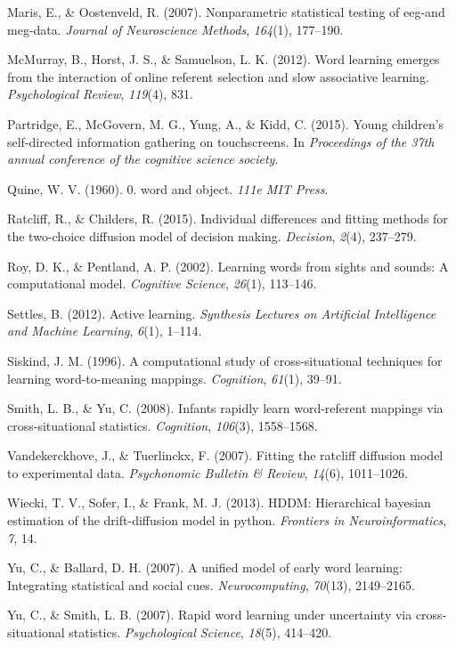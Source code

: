 \documentclass[man,floatsintext]{apa6}
\begin{document}
\hypertarget{ref-maris2007nonparametric}{}
Maris, E., \& Oostenveld, R. (2007). Nonparametric statistical testing
of eeg-and meg-data. \emph{Journal of Neuroscience Methods},
\emph{164}(1), 177--190.

\hypertarget{ref-mcmurray2012word}{}
McMurray, B., Horst, J. S., \& Samuelson, L. K. (2012). Word learning
emerges from the interaction of online referent selection and slow
associative learning. \emph{Psychological Review}, \emph{119}(4), 831.

\hypertarget{ref-partridge2015young}{}
Partridge, E., McGovern, M. G., Yung, A., \& Kidd, C. (2015). Young
children's self-directed information gathering on touchscreens. In
\emph{Proceedings of the 37th annual conference of the cognitive science
society}.

\hypertarget{ref-quine19600}{}
Quine, W. V. (1960). 0. word and object. \emph{111e MIT Press}.

\hypertarget{ref-ratcliff2015individual}{}
Ratcliff, R., \& Childers, R. (2015). Individual differences and fitting
methods for the two-choice diffusion model of decision making.
\emph{Decision}, \emph{2}(4), 237--279.

\hypertarget{ref-roy2002learning}{}
Roy, D. K., \& Pentland, A. P. (2002). Learning words from sights and
sounds: A computational model. \emph{Cognitive Science}, \emph{26}(1),
113--146.

\hypertarget{ref-settles2012active}{}
Settles, B. (2012). Active learning. \emph{Synthesis Lectures on
Artificial Intelligence and Machine Learning}, \emph{6}(1), 1--114.

\hypertarget{ref-siskind1996computational}{}
Siskind, J. M. (1996). A computational study of cross-situational
techniques for learning word-to-meaning mappings. \emph{Cognition},
\emph{61}(1), 39--91.

\hypertarget{ref-smith2008infants}{}
Smith, L. B., \& Yu, C. (2008). Infants rapidly learn word-referent
mappings via cross-situational statistics. \emph{Cognition},
\emph{106}(3), 1558--1568.

\hypertarget{ref-vandekerckhove2007fitting}{}
Vandekerckhove, J., \& Tuerlinckx, F. (2007). Fitting the ratcliff
diffusion model to experimental data. \emph{Psychonomic Bulletin \&
Review}, \emph{14}(6), 1011--1026.

\hypertarget{ref-wiecki2013hddm}{}
Wiecki, T. V., Sofer, I., \& Frank, M. J. (2013). HDDM: Hierarchical
bayesian estimation of the drift-diffusion model in python.
\emph{Frontiers in Neuroinformatics}, \emph{7}, 14.

\hypertarget{ref-yu2007unified}{}
Yu, C., \& Ballard, D. H. (2007). A unified model of early word
learning: Integrating statistical and social cues.
\emph{Neurocomputing}, \emph{70}(13), 2149--2165.

\hypertarget{ref-yu2007rapid}{}
Yu, C., \& Smith, L. B. (2007). Rapid word learning under uncertainty
via cross-situational statistics. \emph{Psychological Science},
\emph{18}(5), 414--420.

\endgroup
\end{document}
